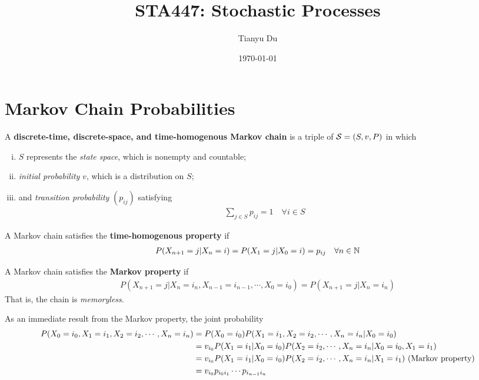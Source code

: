 \documentclass{article}
\title{STA447: Stochastic Processes}
\date{\today}
\author{Tianyu Du}
\begin{document}
    \maketitle
    \tableofcontents
    \newpage
    \section{Markov Chain Probabilities}
    
    \begin{definition}
    	A \textbf{discrete-time, discrete-space, and time-homogenous Markov chain} is a triple of $\mathcal{{S}} = (S, v, P)$ in which
    	\begin{enumerate}[(i)]
    		\item $S$ represents the \emph{state space}, which is nonempty and countable;
    		\item \emph{initial probability} $v$, which is a distribution on $S$;
    		\item and \emph{transition probability} $(p_{ij})$ satisfying
    		\begin{align}
    			\sum_{j \in S} p_{ij} = 1\quad \forall i \in S
    		\end{align}
    	\end{enumerate}
    \end{definition}
    
    \begin{definition}
    	A Markov chain satisfies the \textbf{time-homogenous property} if
    	\begin{align}
    		P(X_{n+1}=j|X_n=i) = P(X_1=j|X_0=i) = p_{ij}\quad \forall n \in \mathbb{N}
    	\end{align}
    \end{definition}
    
    \begin{definition}
    	A Markov chain satisfies the \textbf{Markov property} if
    	\begin{align}
    		P(X_{n+1}=j|X_n=i_n, X_{n-1}=i_{n-1}, \cdots, X_0=i_0) = P(X_{n+1}=j|X_n=i_n)
    	\end{align}
    	That is, the chain is \emph{memoryless}.
    \end{definition}
    
    \begin{proposition}
    	As an immediate result from the Markov property, the joint probability
    	\begin{align}
    		P(X_0=i_0, X_1=i_1, X_2=i_2, \cdots, X_n=i_n)
    		&= P(X_0=i_0) P(X_1=i_1, X_2=i_2, \cdots, X_n=i_n|X_0=i_0) \\
    		&= v_{i_0} P(X_1=i_1|X_0=i_0) P(X_2=i_2, \cdots, X_n=i_n|X_0=i_0, X_1=i_1) \\
    		&= v_{i_0} P(X_1=i_1|X_0=i_0) P(X_2=i_2, \cdots, X_n=i_n|X_1=i_1) \text{{ (Markov property)}}\\
    		&= v_{i_0} p_{i_0 i_1} \cdots p_{i_{n-1}i_n}
    	\end{align}
    \end{proposition}
    
\end{document}
